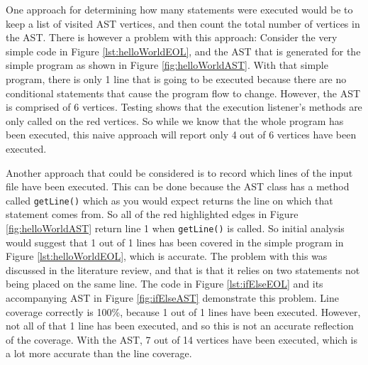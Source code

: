 One approach for determining how many statements were executed would be to keep a list of visited AST vertices, and then count the total number of vertices in the AST. There is however a problem with this approach: Consider the very simple code in Figure \ref{lst:helloWorldEOL}, and the AST that is generated for the simple program as shown in Figure \ref{fig:helloWorldAST}. With that simple program, there is only 1 line that is going to be executed because there are no conditional statements that cause the program flow to change. However, the AST is comprised of 6 vertices. Testing shows that the execution listener's methods are only called on the red vertices. So while we know that the whole program has been executed, this naive approach will report only 4 out of 6 vertices have been executed.

Another approach that could be considered is to record which lines of the input file have been executed. This can be done because the AST class has a method called \verb+getLine()+ which as you would expect returns the line on which that statement comes from. So all of the red highlighted edges in Figure \ref{fig:helloWorldAST} return line 1 when \verb|getLine()| is called. So initial analysis would suggest that 1 out of 1 lines has been covered in the simple program in Figure \ref{lst:helloWorldEOL}, which is accurate. The problem with this was discussed in the literature review, and that is that it relies on two statements not being placed on the same line. The code in Figure \ref{lst:ifElseEOL} and its accompanying AST in Figure \ref{fig:ifElseAST} demonstrate this problem. Line coverage correctly is 100\%, because 1 out of 1 lines have been executed. However, not all of that 1 line has been executed, and so this is not an accurate reflection of the coverage. With the AST, 7 out of 14 vertices have been executed, which is a lot more accurate than the line coverage.

